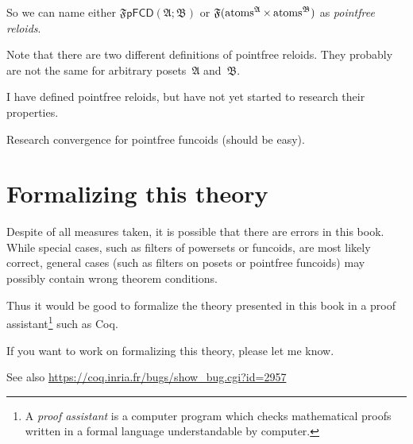 So we can name either $\mathfrak{F}\mathsf{pFCD}(\mathfrak{A};\mathfrak{B})$
or $\mathfrak{F}(\operatorname{atoms}^{\mathfrak{A}}\times\operatorname{atoms}^{\mathfrak{B}})$
as \emph{pointfree reloids}.

Note that there are two different definitions of pointfree reloids.
They probably are not the same for arbitrary posets~$\mathfrak{A}$
and~$\mathfrak{B}$.

I have defined pointfree reloids, but have not yet started to research
their properties.

Research convergence for pointfree funcoids (should be easy).


\section{Formalizing this theory}

Despite of all measures taken, it is possible that there are errors
in this book. While special cases, such as filters of powersets or
funcoids, are most likely correct, general cases (such as filters
on posets or pointfree funcoids) may possibly contain wrong theorem
conditions.

Thus it would be good to formalize the theory presented in this book
in a proof assistant\footnote{A \emph{proof assistant} is a computer program which checks mathematical
proofs written in a formal language understandable by computer.} such as Coq.

If you want to work on formalizing this theory, please let me know.

See also \href{https://coq.inria.fr/bugs/show_bug.cgi?id=2957}{https://coq.inria.fr/bugs/show\_{}bug.cgi?id=2957}
